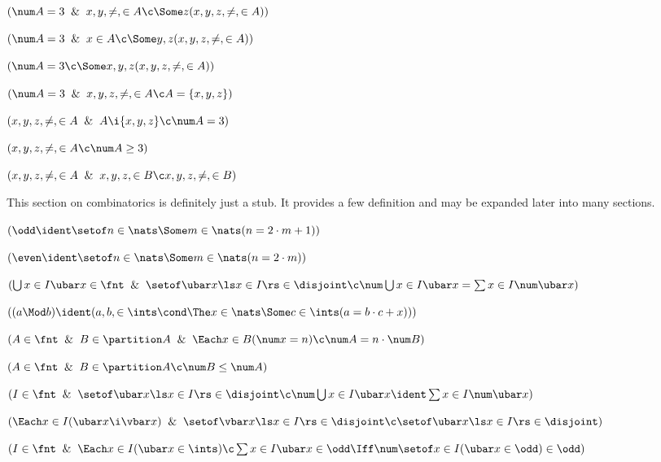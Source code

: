  $(\num A = 3 \And x,y,\ne,\in A \c \Some z(x,y,z,\ne,\in A))$

 $(\num A = 3 \And x \in A \c \Some y,z (x,y,z,\ne,\in A))$

 $(\num A = 3 \c \Some x,y,z (x,y,z,\ne,\in A))$

 $(\num A = 3 \And x,y,z,\ne,\in A \c A = \{x,y,z\})$

 $(x,y,z,\ne,\in A \And A \i \{x,y,z\}\c \num A = 3)$

 $(x,y,z,\ne,\in A \c \num A \ge 3)$

 $(x,y,z,\ne,\in A \And x,y,z,\in B
\c x,y,z,\ne,\in B)$
\lineb


This section on combinatorics is definitely just a stub.  It provides a few
definition and may be expanded later into many sections.
\lineb


 $(\odd \ident \setof n \in \nats\Some m \in \nats(n = 2 \cdot m + 1))$

 $(\even \ident \setof n \in \nats\Some m \in \nats(n = 2 \cdot m ))$

 $(\bigcup x \in I \ubar x\in \fnt \And 
\setof \ubar x \ls x \in I \rs\in\disjoint 
\c \num \bigcup x \in I \ubar x = \sum x \in I \num \ubar x)$


 $((a \Mod b) \ident (a,b,\in \ints \cond
\The x \in \nats \Some c \in \ints (a = b \cdot c + x)))$

 $(A \in \fnt \And B \in \partition A \And \Each x \in B(\num x = n) 
\c \num A = n \cdot \num B)$

 $(A \in \fnt \And B \in \partition A \c \num B \le  \num A)$

 $( I \in \fnt \And
\setof \ubar x \ls x \in I \rs\in\disjoint 
\c \num \bigcup x \in I \ubar x \ident \sum x \in I \num \ubar x)$

 $( \Each x \in I (\ubar x \i \vbar x) \And
\setof \vbar x \ls x \in I \rs\in\disjoint 
\c \setof \ubar x \ls x \in I \rs\in\disjoint)$ 

 $( I \in \fnt \And \Each x \in I (\ubar x \in \ints)
\c \sum x \in I \ubar x \in \odd \Iff \num\setof x \in I (\ubar x \in\odd)\in\odd)$
\lineb

\lineb

